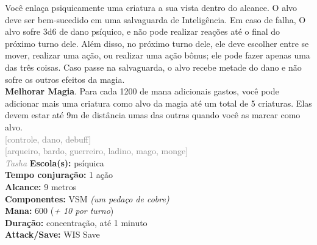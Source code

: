 \documentclass{RPG_Adventure}[2021/10/20]
\begin{document}
{\normalsize Você enlaça psiquicamente uma criatura a sua vista dentro do alcance. O alvo deve ser bem-sucedido em uma salvaguarda de Inteligência. Em caso de falha, O alvo sofre 3d6 de dano psíquico, e não pode realizar reações até o final do próximo turno dele. Além disso, no próximo turno dele, ele deve escolher entre se mover, realizar uma ação, ou realizar uma ação bônus; ele pode fazer apenas uma das três coisas. Caso passe na salvaguarda, o alvo recebe metade do dano e não sofre os outros efeitos da magia.\\\t \textbf{Melhorar Magia}. Para cada 1200 de mana adicionais gastos, você pode adicionar mais uma criatura como alvo da magia até um total de 5 criaturas. Elas devem estar até 9m de distância umas das outras quando você as marcar como alvo.\\}
{\scriptsize \textcolor{gray}{[controle, dano, debuff]\\}}
{\scriptsize \textcolor{gray}{[arqueiro, bardo, guerreiro, ladino, mago, monge]\\}}
{\tiny \textcolor{gray}{\textit{Tasha}}}\jump{}
{\small \t \textbf{Escola(s):} psíquica\\\t \textbf{Tempo conjuração:} 1 ação\\\t \textbf{Alcance:} 9 metros\\\t \textbf{Componentes:} VSM \textit{(um pedaço de cobre)}\\\t \textbf{Mana:} 600 (\textit{+ 10 por turno})\\\t \textbf{Duração:} concentração, até 1 minuto\\\t \textbf{Attack/Save:} WIS Save\\}
\end{document}

